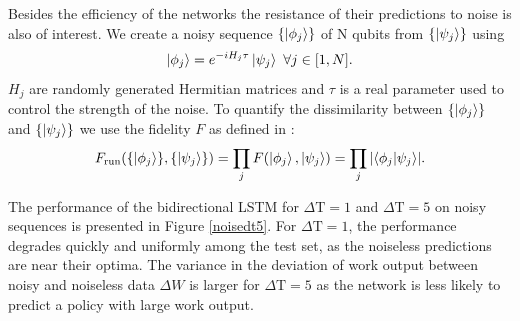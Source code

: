 Besides the efficiency of the networks the resistance of their predictions to noise is also of interest.
We create a noisy sequence $\{\ket{\phi_j}\}$ of N qubits from $\{\ket{\psi_j}\}$ using
\begin{align*}
	\ket{\phi_j} = e^{-i H_j \tau} \ket{\psi_j} \ \forall j \in [1, N].
\end{align*}
$H_j$ are randomly generated Hermitian matrices and $\tau$ is a real parameter used to control the strength of the noise.
To quantify the dissimilarity between $\{\ket{\phi_j}\}$ and $\{\ket{\psi_j}\}$ we use the fidelity $F$ as defined in \cite{10.5555/1972505}:
\begin{align*}
	F_{\text{run}}(\{\ket{\phi_j}\}, \{\ket{\psi_j}\}) = \prod_j F(\ket{\phi_j}, \ket{\psi_j}) = \prod_j \abs{\bra{\phi_j}\ket{\psi_j}}.
\end{align*}

The performance of the bidirectional LSTM for $\Delta \mathrm{T} = 1$ and $\Delta \mathrm{T} = 5$ on noisy sequences is presented in Figure \ref{noisedt5}.
For $\Delta \mathrm{T} = 1$, the performance degrades quickly and uniformly among the test set, as the noiseless predictions are near their optima.
The variance in the deviation of work output between noisy and noiseless data $\Delta W$ is larger for $\Delta \mathrm{T} = 5$ as the network is less likely to predict a policy with large work output.

